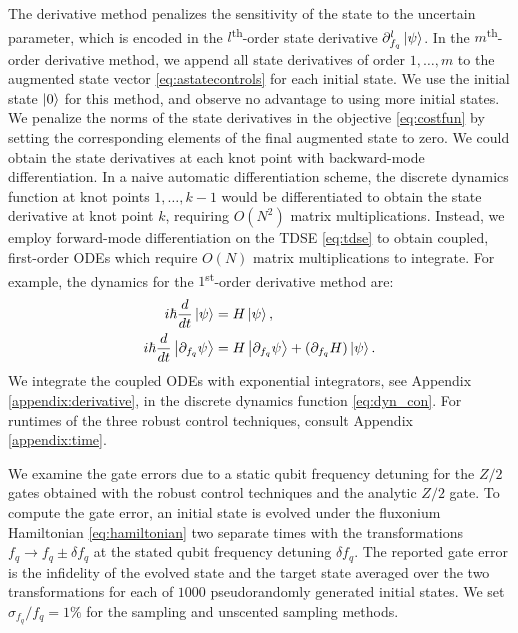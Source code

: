 The derivative method penalizes the sensitivity of the state
to the uncertain parameter, which is encoded in the $l$\textsuperscript{th}-order
state derivative $\partial_{f_{q}}^{l} \ket{\psi}$. In the $m$\textsuperscript{th}-order
derivative method, we append all state derivatives of order $1, \dots, m$
to the augmented state vector \eqref{eq:astatecontrols}
for each initial state. We use the initial state $\ket{0}$ for this method,
and observe no advantage to using more initial states.
We penalize the norms of the state derivatives
in the objective \eqref{eq:costfun} by setting the corresponding elements
of the final augmented state to zero.
We could obtain the state derivatives at each knot point
with backward-mode differentiation.
In a naive automatic differentiation scheme,
the discrete dynamics function at knot points
$1, \dots, k - 1$ would be differentiated to obtain the state
derivative at knot point $k$, requiring
$O(N^{2})$ matrix multiplications. Instead, we 
employ forward-mode differentiation on the TDSE \eqref{eq:tdse}
to obtain coupled, first-order ODEs
which require $O(N)$ matrix multiplications to integrate.
For example, the dynamics for the $1$\textsuperscript{st}-order derivative method are:
\begin{align}
  i \hbar \frac{d}{dt} \ket{\psi} &= H \ket{\psi},\\
  i \hbar \frac{d}{dt} \ket{\partial_{f_{q}}\psi} &=
  H \ket{\partial_{f_{q}} \psi} +
  (\partial_{f_{q}} H) \ket{\psi}.
  \label{eq:d1dyn}
\end{align}
We integrate the coupled ODEs with exponential
integrators, see Appendix \ref{appendix:derivative},
in the discrete dynamics function \eqref{eq:dyn_con}. For runtimes
of the three robust control techniques,
consult Appendix \ref{appendix:time}.

We examine the gate errors due to a static qubit frequency
detuning for the $Z/2$ gates obtained with the robust control techniques
and the analytic $Z/2$ gate.
To compute the gate error,
an initial state is evolved
under the fluxonium Hamiltonian \eqref{eq:hamiltonian}
two separate times with the transformations
$f_{q} \rightarrow f_{q} \pm \delta f_{q}$
at the stated qubit frequency detuning $\delta f_{q}$.
The reported gate error is the infidelity of
the evolved state and the target state averaged over
the two transformations for each of $1000$ pseudorandomly
generated initial states.
We set $\sigma_{f_{q}}/f_{q} = 1\%$
for the sampling and unscented sampling
methods.

